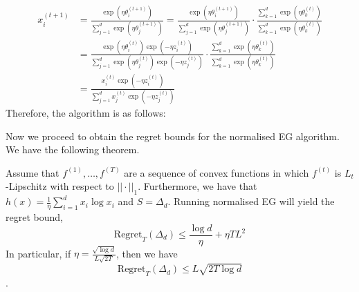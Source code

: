 \begin{align*}
x_i^{(t+1)} &= \frac{\exp(\eta \theta_i^{(t+1)})}{\sum_{j=1}^d \exp(\eta \theta_j^{(t+1)})} = \frac{\exp(\eta \theta_i^{(t+1)})}{\sum_{j=1}^d \exp(\eta \theta_j^{(t+1)})} \cdot \frac{\sum_{k=1}^d \exp(\eta \theta_k^{(t)})}{\sum_{k=1}^d \exp(\eta \theta_k^{(t)})} \\
&= \frac{\exp(\eta \theta_i^{(t)}) \exp(-\eta z_i^{(t)})}{\sum_{j=1}^d \exp(\eta \theta_j^{(t)}) \exp(-\eta z_j^{(t)})} \cdot \frac{\sum_{k=1}^d \exp(\eta \theta_k^{(t)})}{\sum_{k=1}^d \exp(\eta \theta_k^{(t)})} \\
&= \frac{x_i^{(t)} \exp(-\eta z_i^{(t)})}{\sum_{j=1}^d x_j^{(t)} \exp(-\eta z_j^{(t)})}
\end{align*}
Therefore, the algorithm is as follows:
\begin{center}
\end{center}
Now we proceed to obtain the regret bounds for the normalised EG algorithm. We have the following theorem.
\begin{theorem}\label{thm:regret_normalised_EG}
    Assume that $f^{(1)}, \ldots, f^{(T)}$ are a sequence of convex functions in which $f^{(t)}$ is $L_t$-Lipschitz with respect to $||\cdot||_1$. Furthermore, we have that $h(x) = \frac{1}{\eta}\sum_{i=1}^d x_i\log x_i$ and $S = \Delta_d$. Running normalised EG will yield the regret bound,
    \begin{equation}\label{eqn:neg_regret}
        \text{Regret}_T(\Delta_d) \leq \frac{\log d}{\eta} + \eta TL^2
    \end{equation}
    In particular, if $\eta = \frac{\sqrt{\log d}}{L \sqrt{2T}}$, then we have $$\text{Regret}_T(\Delta_d) \leq L\sqrt{2T \log d}$$.
\end{theorem}
